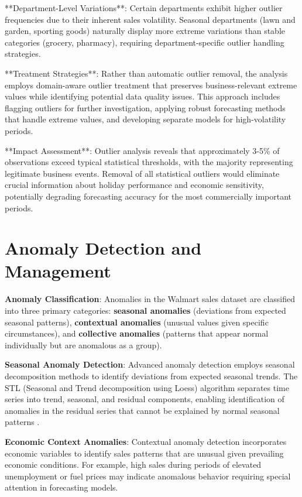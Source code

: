 **Department-Level Variations**: Certain departments exhibit higher outlier frequencies due to their inherent sales volatility. Seasonal departments (lawn and garden, sporting goods) naturally display more extreme variations than stable categories (grocery, pharmacy), requiring department-specific outlier handling strategies.

**Treatment Strategies**: Rather than automatic outlier removal, the analysis employs domain-aware outlier treatment that preserves business-relevant extreme values while identifying potential data quality issues. This approach includes flagging outliers for further investigation, applying robust forecasting methods that handle extreme values, and developing separate models for high-volatility periods.

**Impact Assessment**: Outlier analysis reveals that approximately 3-5\% of observations exceed typical statistical thresholds, with the majority representing legitimate business events. Removal of all statistical outliers would eliminate crucial information about holiday performance and economic sensitivity, potentially degrading forecasting accuracy for the most commercially important periods.

\section{Anomaly Detection and Management}

\textbf{Anomaly Classification}: Anomalies in the Walmart sales dataset are classified into three primary categories: \textbf{seasonal anomalies} (deviations from expected seasonal patterns), \textbf{contextual anomalies} (unusual values given specific circumstances), and \textbf{collective anomalies} (patterns that appear normal individually but are anomalous as a group).

\textbf{Seasonal Anomaly Detection}: Advanced anomaly detection employs seasonal decomposition methods to identify deviations from expected seasonal trends. The STL (Seasonal and Trend decomposition using Loess) algorithm separates time series into trend, seasonal, and residual components, enabling identification of anomalies in the residual series that cannot be explained by normal seasonal patterns \cite{McElroy:2018}.

\textbf{Economic Context Anomalies}: Contextual anomaly detection incorporates economic variables to identify sales patterns that are unusual given prevailing economic conditions. For example, high sales during periods of elevated unemployment or fuel prices may indicate anomalous behavior requiring special attention in forecasting models.

